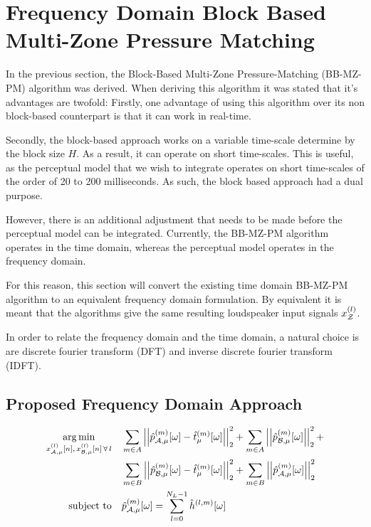 \section{Frequency Domain Block Based Multi-Zone Pressure Matching}
In the previous section, the Block-Based Multi-Zone Pressure-Matching (BB-MZ-PM) algorithm was derived.
When deriving this algorithm it was stated that it's advantages are twofold:
Firstly, one advantage of using this algorithm over its non block-based counterpart is that it can work in real-time.

Secondly, the block-based approach works on a variable time-scale determine by the block size $H$.
As a result, it can operate on short time-scales.
This is useful, as the perceptual model that we wish to integrate operates on short time-scales of the order of 20 to 200 milliseconds.
As such, the block based approach had a dual purpose.

However, there is an additional adjustment that needs to be made before the perceptual model can be integrated. 
Currently, the BB-MZ-PM algorithm operates in the time domain, whereas the perceptual model operates in the frequency domain.

For this reason, this section will convert the existing time domain BB-MZ-PM algorithm to an equivalent frequency domain formulation.
By equivalent it is meant that the algorithms give the same resulting loudspeaker input signals $x_{\mathcal{Z}}^{(l)}$.

In order to relate the frequency domain and the time domain, a natural choice is are discrete fourier transform (DFT) and inverse discrete fourier transform (IDFT).



\subsection{Proposed Frequency Domain Approach}
\begin{align}
    \argmin{x_{\za,\mu}^{(l)}[n],\,x_{\zb,\mu}^{(l)}[n]\,\forall\,l}{
       &\sum_{m\in A} \norm[2][2]{\hat{p}_{\za,\mu}^{(m)}[\omega] - \hat{t}_\mu^{(m)}[\omega]} +
        \sum_{m\in A} \norm[2][2]{\hat{p}_{\zb,\mu}^{(m)}[\omega]} + \\
       &\sum_{m\in B} \norm[2][2]{\hat{p}_{\zb,\mu}^{(m)}[\omega] - \hat{t}_\mu^{(m)}[\omega]} + 
        \sum_{m\in B} \norm[2][2]{\hat{p}_{\za,\mu}^{(m)}[\omega]}
    }\\
    \subjectto{
       &\hat{p}_{\za,\mu}^{(m)}[\omega] = \sum_{l=0}^{N_L-1}\hat{h}^{(l,m)}[\omega]
    }
\end{align}



